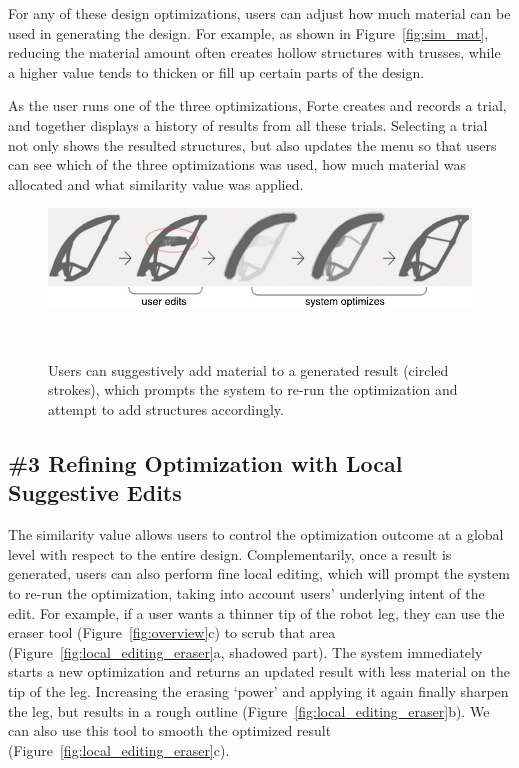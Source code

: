 For any of these design optimizations, users can adjust how much material can be used in generating the design. For example, as shown in Figure~\ref{fig:sim_mat}, reducing the material amount often creates hollow structures with trusses, while a higher value tends to thicken or fill up certain parts of the design.


As the user runs one of the three optimizations, Forte creates and records a trial, and together displays a history of results from all these trials. Selecting a trial not only shows the resulted structures, but also updates the menu so that users can see which of the three optimizations was used, how much material was allocated and what similarity value was applied.


\begin{figure} [b]
  \centering
  \includegraphics[width=0.75\columnwidth]{figures/local_editing_pencil}
  \caption{Users can suggestively add material to a generated result (circled strokes), which prompts the system to re-run the optimization and attempt to add structures accordingly.}~\label{fig:local_editing_pencil}
\end{figure}

\subsection{\#3 Refining Optimization with Local Suggestive Edits}
The similarity value allows users to control the optimization outcome at a global level with respect to the entire design. Complementarily, once a result is generated, users can also perform fine local editing, which will prompt the system to re-run the optimization, taking into account users' underlying intent of the edit. For example, if a user wants a thinner tip of the robot leg, they can use the eraser tool (Figure~\ref{fig:overview}c) to scrub that area (Figure~\ref{fig:local_editing_eraser}a, shadowed part). The system immediately starts a new optimization and returns an updated result with less material on the tip of the leg. Increasing the erasing `power' and applying it again finally sharpen the leg, but results in a rough outline (Figure~\ref{fig:local_editing_eraser}b). We can also use this tool to smooth the optimized result (Figure~\ref{fig:local_editing_eraser}c).

